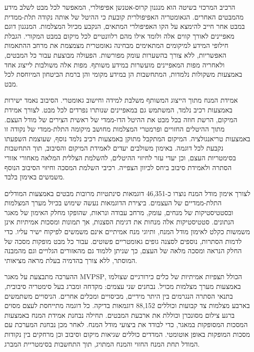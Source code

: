 {הרכיב המרכזי בשיטה הוא מנגנון קרוס-אטנשן אפיפולרי, המאפשר לכל מבט לשלב מידע מהמבטים האחרים. הגאומטריה האפיפולרית קובעת כי ההיטל של אותה נקודה תלת-ממדית במבט אחר חייב להימצא על הקו האפיפולרי המתאים, הנקבע מכיול המצלמות. המנגנון דוגם מאפיינים לאורך קווים אלה ולומד אילו מהם רלוונטיים לכל מיקום במבט המקורי. הגבלת חילופי המידע למיקומים המתאימים מבחינה גאומטרית מצמצמת את מרחב ההתאמות האפשריות, ללא צורך בהשערות עומק מפורשות. הפעולה מבוצעת עבור כל המבטים, ולאחריה מפות המאפיינים מועשרות במידע משותף. מפות אלה משולבות לייצוג אחד באמצעות משקולות נלמדות, המתחשבות הן במידע מקומי והן ברמת הביטחון המיוחסת לכל מבט.

אמידת המנח מתוך הייצוג המשותף משלבת למידה וחישוב גאומטרי. הסיבוב נאמד ישירות באמצעות רכיב נלמד, המשתמש גם במאפיינים שנותרו נפרדים לכל מבט. לצורך אמידת המיקום, הרשת חוזה בכל מבט את ההיטל הדו-ממדי של ראשית הצירים של מודל העצם. מתוך ההיטלים החזויים ופרמטרי המצלמות מחושב מיקומה התלת-ממדי של נקודה זו באמצעות טריאנגולציה. המיקום המתקבל מתוקן באמצעות רכיב נלמד נוסף, שעוצמת השפעתו נקבעת לכל דוגמה. באימון משולבים יעדים לאמידת המיקום והסיבוב, תוך התחשבות בסימטריות העצם, וכן יעדי עזר לחיזוי ההיטלים, להשלמת הצללית המלאה מאחורי אזורי הסתרה ולאמידת סיבוב ביחס לכיוון הצפייה. רכיבי השלמת המסכה וחיזוי הסיבוב הנוסף משמשים באימון בלבד.

לצורך אימון מודל המנח נוצרו כ-\textenglish{46,351} דוגמאות סינתטיות מרובות מבטים באמצעות המודלים התלת-ממדיים של העצמים. ביצירת הדוגמאות נעשה שימוש בכיול מערך המצלמות ובסטטיסטיקות של מנחים, עומק, מרחב עבודה ונראות, שהופקו מחלק האימון של מאגר הנתונים. סטטיסטיקות אלה מנחות את דגימת הסצנות, אך תמונות ומסכות אמיתיות אינן משמשות כקלט לאימון מודל המנח, ותיוגי מנח אמיתיים אינם משמשים לפיקוח ישיר עליו. כדי לדמות הסתרות, נוספים לסצנה גופים גאומטריים פשוטים. עבור כל מבט מופקות מסכה של החלק הנראה ומסכה מלאה של העצם, כך שניתן ללמוד גם מהאזורים הגלויים וגם מהמבנה המוסתר, ללא צורך בהדמיה בעלת מראה מציאותי.

ההערכה מתבצעת על מאגר \textenglish{MVPSP}, הכולל תצפיות אמיתיות של כלים כירורגיים שצולמו באמצעות מערך מצלמות מכויל. נבחנים שני עצמים: מקדחה ומברג בעל סימטריה סיבובית, בתנאי הסתרה הנגרמים בין היתר מידיים, מכיסויים ומכלים אחרים. הניסויים משתמשים בארבע מצלמות צד קבועות וכוללים \textenglish{88,152} דוגמאות בדיקה. כל דוגמה מתייחסת לעצם מסוים ברגע צילום מסונכרן וכוללת את ארבעת המבטים. תחילה נבחנת אמידת המנח באמצעות המסכות המסופקות במאגר, כדי לבודד את ביצועי מודל המנח. לאחר מכן נבחנת המערכת עם מסכות המופקות באופן אוטומטי. המדדים כוללים שגיאות מיקום וסיבוב וכן מרחקים בין נקודות המודל תחת המנח החזוי והמנח המתויג, תוך התחשבות בסימטריית המברג.

}
